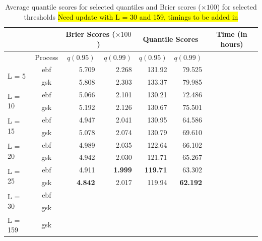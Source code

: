 \documentclass[11pt]{article}
\begin{document}
\begin{table}[htbp]
\caption{Average quantile scores for selected quantiles and Brier scores ($\times 100$) for selected thresholds \hl{Need update with L = 30 and 159, timings to be added in}}
\centering
\small
  \begin{tabular}{lc|rr|rr|c}
   \multicolumn{2}{c}{  }& \multicolumn{2}{c|}{Brier Scores ($\times 100$)} & \multicolumn{2}{|c|}{Quantile Scores} & Time (in hours)\\
   \hline
   & Process & $q(0.95)$ & $q(0.99)$ & $q(0.95)$ & $q(0.99)$\\
   \hline
  \multirow{2}{*}{L = 5}  & ebf & 5.709 & 2.268 & 131.92 & 79.525 & \\
                          & gsk & 5.808 & 2.303 & 133.37 & 79.985 & \\
   \hline
  \multirow{2}{*}{L = 10} & ebf & 5.066 & 2.101 & 130.21 & 72.486 & \\
                          & gsk & 5.192 & 2.126 & 130.67 & 75.501 & \\
   \hline
  \multirow{2}{*}{L = 15} & ebf & 4.947 & 2.041 & 130.95 & 64.586 & \\
                          & gsk & 5.078 & 2.074 & 130.79 & 69.610 & \\
   \hline
  \multirow{2}{*}{L = 20} & ebf & 4.989 & 2.035 & 122.64 & 66.102 & \\
                          & gsk & 4.942 & 2.030 & 121.71 & 65.267 & \\
   \hline
  \multirow{2}{*}{L = 25} & ebf & 4.911 & \textbf{1.999} & \textbf{119.71} & 63.302 & \\
                          & gsk & \textbf{4.842} & 2.017 & 119.94 & \textbf{62.192} & \\
   \hline
  \multirow{2}{*}{L = 30} & ebf &  &  &  &  & \\
                          & gsk &  &  &  &  & \\
  \hline
  L = 159                 & gsk &  &  &  &  & \\
  \hline
	\end{tabular}
\end{table}

\end{document}
